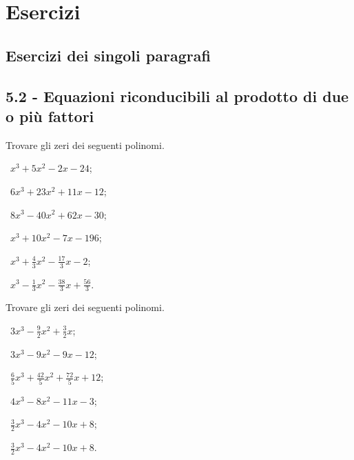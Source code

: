 \section{Esercizi}
\subsection{Esercizi dei singoli paragrafi}
\subsection*{5.2 - Equazioni riconducibili al prodotto di due o più fattori}

\begin{esercizio}[\Ast]
 \label{ese:5.1}
Trovare gli zeri dei seguenti polinomi.
\begin{multicols}{2}
 \begin{enumeratea}
 \item~$x^3+5x^2-2x-24$;
 \item~$6x^3+23x^2+11x-12$;
 \item~$8x^3-40x^2+62x-30$;
 \item~$x^3+10x^2-7x-196$;
 \item~$x^3+\frac 4 3x^2-\frac{17} 3x-2$;
 \item~$x^3-\frac 1 3x^2-\frac{38} 3x+\frac{56} 3$.
 \end{enumeratea}
 \end{multicols}
\end{esercizio}

\begin{esercizio}[\Ast]
\label{ese:5.2}
Trovare gli zeri dei seguenti polinomi.
\begin{multicols}{2}
 \begin{enumeratea}
 \item~$3x^3-\frac 9 2x^2+\frac 3 2x$;
 \item~$3x^3-9x^2-9x-12$;
 \item~$\frac 6 5x^3+\frac{42} 5x^2+\frac{72} 5x+12$;
 \item~$4x^3-8x^2-11x-3$;
 \item~$\frac 3 2x^3-4x^2-10x+8$;
 \item~$\frac 3 2x^3-4x^2-10x+8$.
 \end{enumeratea}
 \end{multicols}
\end{esercizio}

